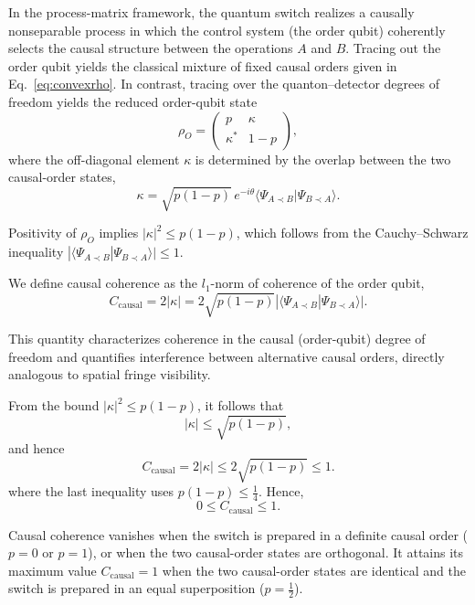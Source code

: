 \documentclass[aps,pra,reprint,superscriptaddress]{revtex4-2}
\begin{document}
In the process-matrix framework, the quantum switch realizes
a causally nonseparable process in which the control system
(the order qubit) coherently selects the causal structure
between the operations $A$ and $B$. Tracing out the order qubit yields the classical mixture of
fixed causal orders given in Eq.~\eqref{eq:convexrho}.
In contrast, tracing over the quanton--detector degrees of
freedom yields the reduced order-qubit state
\begin{equation}
\rho_O =
\begin{pmatrix}
p & \kappa \\
\kappa^* & 1-p
\end{pmatrix},
\end{equation}
where the off-diagonal element $\kappa$ is determined by the
overlap between the two causal-order states,
\begin{equation}
\kappa = \sqrt{p(1-p)}\,e^{-i\theta}
\langle\Psi_{A\prec B}|\Psi_{B\prec A}\rangle .
\end{equation}

Positivity of $\rho_O$ implies $|\kappa|^2 \le p(1-p)$,
which follows from the Cauchy--Schwarz inequality
$|\langle \Psi_{A\prec B} | \Psi_{B\prec A} \rangle| \le 1$.

\medskip
\noindent
We define causal coherence as the $l_1$-norm of coherence of the order qubit,
\begin{equation}
C_{\mathrm{causal}}
= 2|\kappa|
= 2\sqrt{p(1-p)}
|\langle \Psi_{A\prec B} | \Psi_{B\prec A} \rangle|.
\label{eq:C_causal}
\end{equation}

This quantity characterizes coherence in the causal (order-qubit) degree of freedom and quantifies interference between alternative causal orders, directly analogous to spatial fringe visibility.

From the bound $|\kappa|^2 \le p(1-p)$, it follows that
\[
|\kappa| \le \sqrt{p(1-p)},
\]
and hence
\[
C_{\mathrm{causal}} = 2|\kappa| \le 2\sqrt{p(1-p)} \le 1.
\]
where the last inequality uses $p(1-p)\le \tfrac{1}{4}$. Hence,
\[
0 \le C_{\mathrm{causal}} \le 1.
\]

Causal coherence vanishes when the switch is prepared in a definite causal order ($p=0$ or $p=1$), or when the two causal-order states are orthogonal. It attains its maximum value $C_{\mathrm{causal}}=1$ when the two causal-order states are identical and the switch is prepared in an equal superposition ($p=\tfrac{1}{2}$).

\medskip
\end{document}
